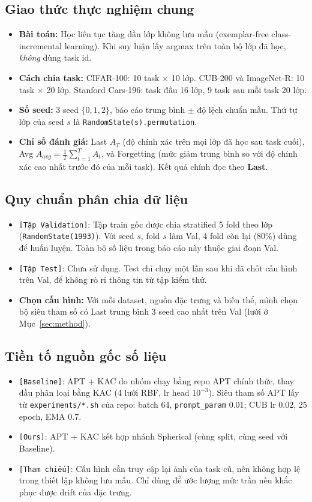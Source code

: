 \documentclass[10pt,a4paper]{article}
\newcommand{\src}[1]{\texttt{[#1]}}
\begin{document}
\subsection{Giao thức thực nghiệm chung}
\begin{itemize}
  \item \textbf{Bài toán:} Học liên tục tăng dần lớp không lưu mẫu (exemplar-free class-incremental learning). Khi suy luận lấy argmax trên toàn bộ lớp đã học, \emph{không} dùng task id.
  \item \textbf{Cách chia task:} CIFAR-100: 10 task $\times$ 10 lớp. CUB-200 và ImageNet-R: 10 task $\times$ 20 lớp. Stanford Cars-196: task đầu 16 lớp, 9 task sau mỗi task 20 lớp.
  \item \textbf{Số seed:} 3 seed $\{0,1,2\}$, báo cáo trung bình $\pm$ độ lệch chuẩn mẫu. Thứ tự lớp của seed $s$ là \texttt{RandomState(s).permutation}.
  \item \textbf{Chỉ số đánh giá:} Last $A_T$ (độ chính xác trên mọi lớp đã học sau task cuối), Avg $A_{avg} = \frac{1}{T}\sum_{t=1}^{T} A_t$, và Forgetting (mức giảm trung bình so với độ chính xác cao nhất trước đó của mỗi task). Kết quả chính đọc theo \textbf{Last}.
\end{itemize}

\subsection{Quy chuẩn phân chia dữ liệu}
\begin{itemize}
  \item \src{Tập Validation}: Tập train gốc được chia stratified 5 fold theo lớp (\texttt{RandomState(1993)}). Với seed $s$, fold $s$ làm Val, 4 fold còn lại (80\%) dùng để huấn luyện. Toàn bộ số liệu trong báo cáo này thuộc giai đoạn Val.
  \item \src{Tập Test}: Chưa sử dụng. Test chỉ chạy một lần sau khi đã chốt cấu hình trên Val, để không rò rỉ thông tin từ tập kiểm thử.
  \item \textbf{Chọn cấu hình:} Với mỗi dataset, nguồn đặc trưng và biến thể, mình chọn bộ siêu tham số có Last trung bình 3 seed cao nhất trên Val (lưới ở Mục~\ref{sec:method}).
\end{itemize}

\subsection{Tiền tố nguồn gốc số liệu}
\begin{itemize}
  \item \src{Baseline}: APT + KAC do nhóm chạy bằng repo APT chính thức, thay đầu phân loại bằng KAC (4 lưới RBF, lr head $10^{-3}$). Siêu tham số APT lấy từ \texttt{experiments/*.sh} của repo: batch 64, \texttt{prompt\_param} 0.01; CUB lr 0.02, 25 epoch, EMA 0.7.
  \item \src{Ours}: APT + KAC kết hợp nhánh Spherical (cùng split, cùng seed với Baseline).
  \item \src{Tham chiếu}: Cấu hình cần truy cập lại ảnh của task cũ, nên không hợp lệ trong thiết lập không lưu mẫu. Chỉ dùng để ước lượng mức trần nếu khắc phục được drift của đặc trưng.
\end{itemize}
\end{document}
